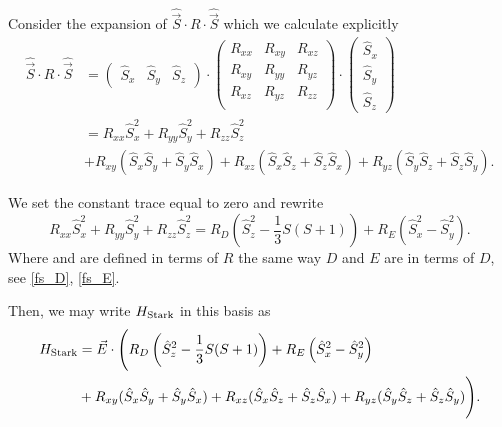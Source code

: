 
Consider the expansion of $\hat{\vec{S}}\cdot R \cdot \hat{\vec{S}}$ which we calculate explicitly 
\begin{equation}
    \begin{align}
        \hat{\vec{S}}\cdot R \cdot \hat{\vec{S}} &= 
    \begin{pmatrix}
        \hat{S}_x & \hat{S}_y & \hat{S}_z
    \end{pmatrix}
    \cdot 
    \begin{pmatrix}
        R_{xx} & R_{xy} & R_{xz} \\
        R_{xy} & R_{yy} & R_{yz} \\
        R_{xz} & R_{yz} & R_{zz} \\
    \end{pmatrix}
    \cdot 
    \begin{pmatrix}
        \hat{S}_x \\ \hat{S}_y \\ \hat{S}_z
    \end{pmatrix}\\ 
         &= R_{xx} \hat{S}_x^2  + R_{yy} \hat{S}_y^2 + R_{zz} \hat{S}_z^2 \\
         &+   R_{xy}(\hat{S}_{x}\hat{S}_y + \hat{S}_y \hat{S}_x) 
        +   R_{xz}(\hat{S}_{x}\hat{S}_z + \hat{S}_z \hat{S}_x) 
        +   R_{yz}(\hat{S}_{y}\hat{S}_z + \hat{S}_z \hat{S}_y).
    \end{align}
    \label{eq:}
\end{equation}

We set the constant trace equal to zero and rewrite 
\begin{equation}
 R_{xx} \hat{S}_x^2  + R_{yy} \hat{S}_y^2 + R_{zz} \hat{S}_z^2   = R_D \left(\hat{S}_z^2 - \frac{1}{3}S(S+1)\right) + R_E\left(\hat{S}_x^2 - \hat{S}_y^2\right).
    \label{eq:}
\end{equation}
Where  and  are defined in terms of $R$ the same way $D$ and $E$ are in terms of $D$, see \eqref{fs_D}, \eqref{fs_E}. 

Then, we may write $H_{\ce{Stark}}$ in this basis as 
\begin{equation}
    \begin{align}
        H_{\ce{Stark}} &=\vec{E} \cdot \Biggl(  R_D \left(\hat{S}_z^2 - \frac{1}{3}S(S+1)\right) + R_E\left(\hat{S}_x^2 - \hat{S}_y^2\right) \\ &+ 
   R_{xy}(\hat{S}_{x}\hat{S}_y + \hat{S}_y \hat{S}_x) 
        +   R_{xz}(\hat{S}_{x}\hat{S}_z + \hat{S}_z \hat{S}_x) 
        +   R_{yz}(\hat{S}_{y}\hat{S}_z + \hat{S}_z \hat{S}_y) \Biggr).
    \end{align}
    \label{eq:}
\end{equation}

